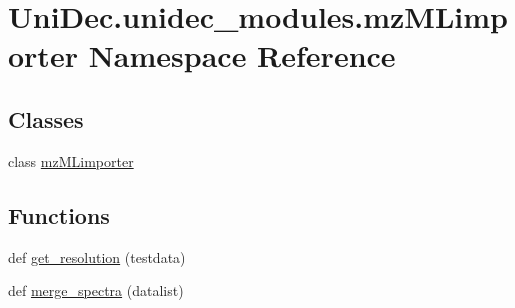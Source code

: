 \hypertarget{namespace_uni_dec_1_1unidec__modules_1_1mz_m_limporter}{}\section{Uni\+Dec.\+unidec\+\_\+modules.\+mz\+M\+Limporter Namespace Reference}
\label{namespace_uni_dec_1_1unidec__modules_1_1mz_m_limporter}
\subsection*{Classes}
\begin{DoxyCompactItemize}
\item 
class \hyperlink{class_uni_dec_1_1unidec__modules_1_1mz_m_limporter_1_1mz_m_limporter}{mz\+M\+Limporter}
\end{DoxyCompactItemize}
\subsection*{Functions}
\begin{DoxyCompactItemize}
\item 
def \hyperlink{namespace_uni_dec_1_1unidec__modules_1_1mz_m_limporter_a21e7a05bdc041971966cc62d601949c9}{get\+\_\+resolution} (testdata)
\item 
def \hyperlink{namespace_uni_dec_1_1unidec__modules_1_1mz_m_limporter_a11132fa6a591ff71f04e4fda6b102b89}{merge\+\_\+spectra} (datalist)
\end{DoxyCompactItemize}
